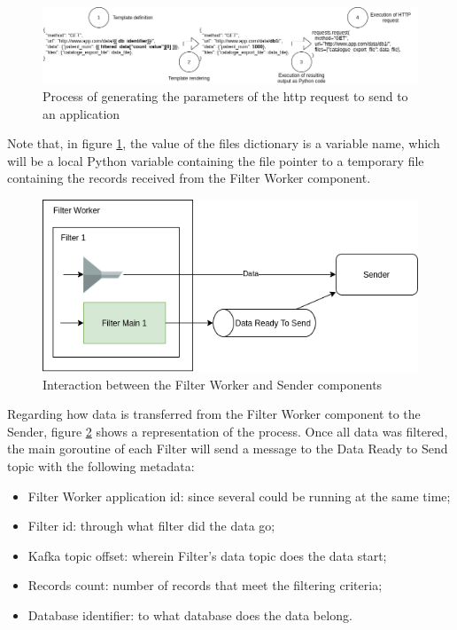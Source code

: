 \begin{figure}[H]
    \center
    \includegraphics[width=\textwidth]{sender-request}
    \caption{Process of generating the parameters of the \gls{http} request to send to an application}
    \label{fig:sender-request}
\end{figure}

Note that, in figure \ref{fig:sender-request}, the value of the files dictionary is a variable name, which will be a local Python variable containing the file pointer to a temporary file containing the records received from the Filter Worker component.

\begin{figure}[H]
    \center
    \includegraphics[width=.5\textwidth]{sender-interaction}
    \caption{Interaction between the Filter Worker and Sender components}
    \label{fig:sender-interaction}
\end{figure}

Regarding how data is transferred from the Filter Worker component to the Sender, figure \ref{fig:sender-interaction} shows a representation of the process.
Once all data was filtered, the main goroutine of each Filter will send a message to the Data Ready to Send topic with the following metadata:
\begin{itemize}
    \item Filter Worker application id: since several could be running at the same time;
    \item Filter id: through what filter did the data go;
    \item Kafka topic offset: wherein Filter's data topic does the data start;
    \item Records count: number of records that meet the filtering criteria;
    \item Database identifier: to what database does the data belong.
\end{itemize}

